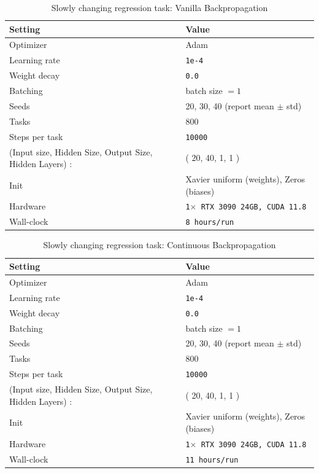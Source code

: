 \documentclass{article}
\begin{document}
\begin{table}[H]
\centering
\footnotesize
\caption{Slowly changing regression task: Vanilla Backpropagation}
\label{tab:scr_bp}
\begin{tabular}{@{}ll@{}}
\toprule
Setting & Value \\ \midrule
Optimizer & Adam \\
Learning rate & \texttt{1e-4} \\
Weight decay & \texttt{0.0} \\
Batching & batch size $=1$ \\
Seeds & 20, 30, 40 (report mean $\pm$ std) \\
Tasks & 800 \\
Steps per task & \texttt{10000} \\
(Input size, Hidden Size, Output Size, Hidden Layers) : & ( 20, 40, 1, 1 ) \\ 
Init & Xavier uniform (weights), Zeros (biases)\\
Hardware & \texttt{1$\times$ RTX 3090 24GB, CUDA 11.8} \\
Wall-clock & \texttt{8 hours/run} \\
\bottomrule
\end{tabular}
\end{table}

\begin{table}[H]
\centering
\footnotesize
\caption{Slowly changing regression task: Continuous Backpropagation}
\label{tab:scr_cbp}
\begin{tabular}{@{}ll@{}}
\toprule
Setting & Value \\ \midrule
Optimizer & Adam \\
Learning rate & \texttt{1e-4} \\
Weight decay & \texttt{0.0} \\
Batching & batch size $=1$ \\
Seeds & 20, 30, 40 (report mean $\pm$ std) \\
Tasks & 800 \\
Steps per task & \texttt{10000} \\
(Input size, Hidden Size, Output Size, Hidden Layers) : & ( 20, 40, 1, 1 ) \\ 
Init & Xavier uniform (weights), Zeros (biases)\\
Hardware & \texttt{1$\times$ RTX 3090 24GB, CUDA 11.8} \\
Wall-clock & \texttt{11 hours/run} \\
\bottomrule
\end{tabular}
\end{table}
\end{document}
